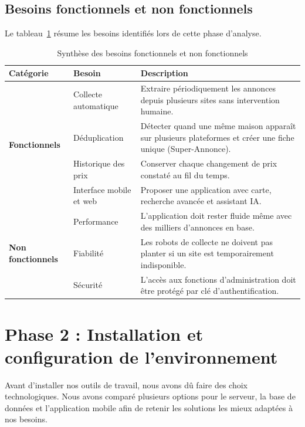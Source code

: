 \subsection{Besoins fonctionnels et non fonctionnels}
Le tableau~\ref{tab:besoins} r\'esume les besoins identifi\'es lors de cette phase d'analyse.
\begin{table}[H]
    \centering
    \small
    \renewcommand{\arraystretch}{1.3}
    \begin{tabularx}{\textwidth}{|l|X|X|}
        \hline
        \rowcolor{headergray}
        \textbf{Cat\'egorie} & \textbf{Besoin} & \textbf{Description} \\ \hline
        \multirow{4}{*}{\textbf{Fonctionnels}}
        & Collecte automatique & Extraire p\'eriodiquement les annonces depuis plusieurs sites sans intervention humaine. \\ \cline{2-3}
        & D\'eduplication & D\'etecter quand une m\^eme maison appara\^it sur plusieurs plateformes et cr\'eer une fiche unique (Super-Annonce). \\ \cline{2-3}
        & Historique des prix & Conserver chaque changement de prix constat\'e au fil du temps. \\ \cline{2-3}
        & Interface mobile et web & Proposer une application avec carte, recherche avanc\'ee et assistant IA. \\ \hline
        \multirow{3}{*}{\textbf{Non fonctionnels}}
        & Performance & L'application doit rester fluide m\^eme avec des milliers d'annonces en base. \\ \cline{2-3}
        & Fiabilit\'e & Les robots de collecte ne doivent pas planter si un site est temporairement indisponible. \\ \cline{2-3}
        & S\'ecurit\'e & L'acc\`es aux fonctions d'administration doit \^etre prot\'eg\'e par cl\'e d'authentification. \\ \hline
    \end{tabularx}
    \caption{Synth\`ese des besoins fonctionnels et non fonctionnels}
    \label{tab:besoins}
\end{table}
\vspace{-6pt}
\section{Phase 2 : Installation et configuration de l'environnement}
\vspace{-2pt}
Avant d'installer nos outils de travail, nous avons d\^u faire des choix technologiques. Nous avons compar\'e plusieurs options pour le serveur, la base de donn\'ees et l'application mobile afin de retenir les solutions les mieux adapt\'ees \`a nos besoins.

